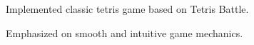 \documentclass[letterpaper]{kevin-resume} %
\begin{document}
\begin{minipage}[t]{0.66\textwidth}
\sectionspace %


\begin{tightitemize}
	\item Implemented classic tetris game based on Tetris Battle.
	\item Emphasized on smooth and intuitive game mechanics.
\end{tightitemize}

\sectionspace %


\end{minipage} %
\hfill
%
%
\end{document}

